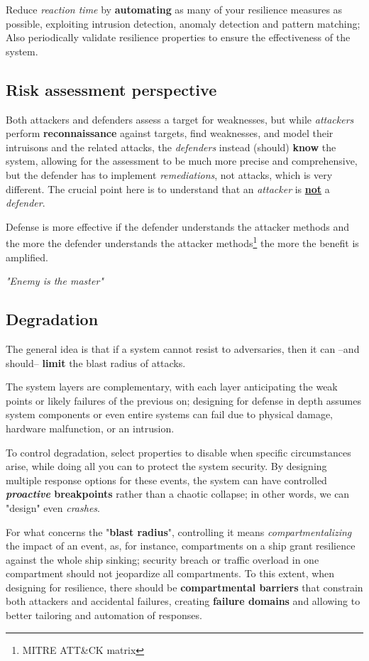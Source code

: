 Reduce \textit{reaction time} by \textbf{automating} as many of your resilience measures as possible, exploiting
intrusion detection, anomaly detection and pattern matching;
Also periodically validate resilience properties to ensure the effectiveness of the system.

\subsection{Risk assessment perspective}
Both attackers and defenders assess a target for weaknesses, but while \textit{attackers} perform \textbf{reconnaissance} against targets, find weaknesses, and model their
intruisons and the related attacks,
the \textit{defenders} instead (should) \textbf{know} the system, allowing for the assessment to be much more precise and comprehensive, 
but the defender has to implement \textit{remediations}, not attacks, which is very different.
The crucial point here is to understand that an \textit{attacker} is \textbf{\underline{not}} a \textit{defender}.
\begin{center}
   Defense is more effective if the defender understands the attacker methods and the more the defender understands the attacker methods\footnote{MITRE ATT\&CK matrix} the more the benefit is amplified.
   \nl

   \textit{"Enemy is the master"}
\end{center}

\subsection{Degradation}
The general idea is that if a system cannot resist to adversaries, then it can {--}and should{--} \textbf{limit} the blast radius of attacks.

The system layers are complementary, with each layer anticipating the weak
points or likely failures of the previous on;
designing for defense in depth assumes system components or even entire systems can fail due to physical damage, hardware malfunction, or an intrusion.

To control degradation, 
select properties to disable when specific circumstances
arise, while doing all you can to protect the system security.
By designing multiple response options for these events, the system can have controlled
\textbf{\textit{proactive} breakpoints} rather than a chaotic collapse;
in other words, we can "design" even \textit{crashes}.
\nl

For what concerns the "\textbf{blast radius}",
controlling it means \textit{compartmentalizing} the impact of an event, 
as, for instance, compartments on a ship grant resilience against the whole ship sinking;
security breach or traffic overload in one compartment should not jeopardize all compartments.
To this extent, when designing for resilience, there should be \textbf{compartmental barriers} that constrain both attackers and accidental failures, creating \textbf{failure domains} and 
allowing to better tailoring and automation of responses.


